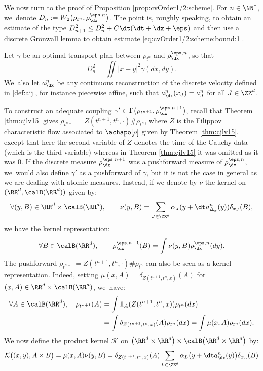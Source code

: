 We now turn to the proof of Proposition \ref{prop:cvOrder1/2:scheme}.
For $n \in \NN^*$, we~denote $D_n:= W_2 \bigl(\rho_{t^n},\rho_{\dx}^{\eps,n} \bigr)$. The point is, roughly speaking, to obtain an estimate of the type $D_{n+1}^2 \leq D_n^2 + C\dt(\dt + \dx + \eps)$ and then use a discrete Grönwall lemma to obtain estimate \eqref{eq:cvOrder1/2:scheme:bound:1}.

Let $\gamma$ be an optimal transport plan between $\rho_{t^n}$ and $\rho_{\dx}^{\eps,n}$, so that
\[
D_n^2 =\iint |x-y|^2 \gamma(dx,dy).
\]
We~also let $a^n_{\dx}$ be any continuous reconstruction of the discrete velocity defined in \eqref{def:aij}, for instance piecewise affine, such that $a_{\dx}^n(x_J) = a_J^n$ for all $J \in \ZZ^d$.

To construct an adequate coupling $\gamma' \in \Gamma\big(\rho_{t^{n+1}}, \rho_{\dx}^{\eps,n+1}\big)$, recall that Theorem \ref{thm:cjlv15} gives $\rho_{t^{n+1}} = Z(t^{n+1}, t^n, \cdot) \# \rho_{t^n}$, where $Z$ is the Filippov characteristic flow associated to $\achapo[\rho]$ given by Theorem \ref{thm:cjlv15}, except that here the second variable of $Z$ denotes the time of the Cauchy data (which is the third variable) whereas in Theorem \ref{thm:cjlv15} it was omitted as it was $0$. If the discrete measure $\rho_{\dx}^{\eps,n+1}$ was a pushforward measure of $\rho_{\dx}^{\eps,n}$, we~would also define $\gamma'$ as a pushforward of $\gamma$, but it is not the case in general as we are dealing with atomic measures. Instead, if we denote by $\nu$ the kernel on $(\RR^d, \calB(\RR^d))$ given by:
\[
\forall (y, B) \in \RR^d \times \calB(\RR^d), \qquad \nu(y, B) = \sum_{J \in \ZZ^d} \alpha_J(y + \dt a^n_{\Delta_x}(y)) \delta_{x_J}(B),
\]
we have the kernel representation:
\[
\forall B \in \calB(\RR^d), \qquad \rho_{\dx}^{\eps,n+1}(B) = \int \nu(y, B) \rho_{\dx}^{\eps,n}(dy).
\]
The pushforward $\rho_{t^{n+1}} = Z(t^{n+1}, t^n, \cdot) \# \rho_{t^n}$ can also be seen as a kernel representation. Indeed, setting $\mu(x, A) = \delta_{Z(t^{n+1}, t^n, x)}(A)$ for $(x,A) \in \RR^d \times \calB(\RR^d)$, we~have:
\begin{align*}
\forall A \in \calB(\RR^d), \quad \rho_{t^{n+1}}(A) &= \int {\mathbf 1}_{A}(Z(t^{n+1}, t^n, x)) \rho_{t^n} (dx) \\
&= \int \delta_{Z(t^{n+1}, t^n, x)}(A) \rho_{t^n} (dx) = \int \mu(x, A) \rho_{t^n} (dx).
\end{align*}
We now define the product kernel ${\mathcal K}$ on $\big(\RR^d \times \RR^d \big) \times \calB\big(\RR^d \times \RR^d \big)$ by:
\[
{\mathcal K} \bigl( (x,y), A \times B \bigr) = \mu(x,A) \nu(y,B) = \delta_{Z(t^{n+1}, t^n, x)}(A)
\sum_{L \in {\ZZ}^d} \alpha_{L}\bigl(y+\dt a^n_{\dx}(y) \bigr)
\delta_{x_L}(B)
\]
